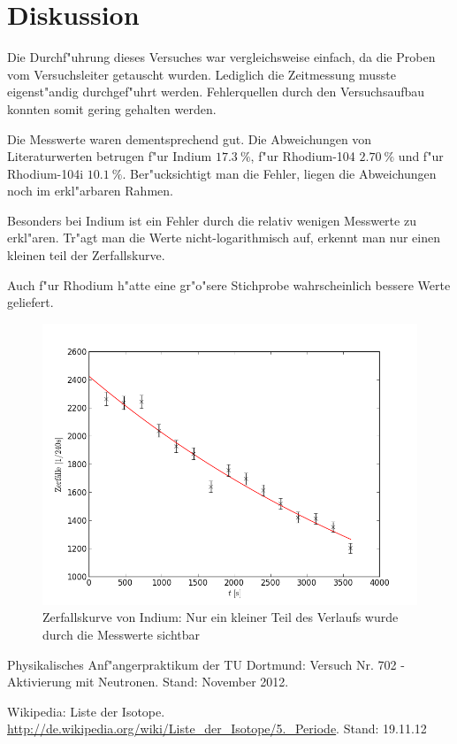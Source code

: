\newpage
\section{Diskussion}
	\label{sec:diskussion}
	Die Durchf"uhrung dieses Versuches war vergleichsweise einfach, da die Proben vom Versuchsleiter getauscht wurden.
	Lediglich die Zeitmessung musste eigenst"andig durch\-ge\-f"uhrt werden.
	Fehlerquellen durch den Versuchsaufbau konnten somit gering gehalten werden.

	Die Messwerte waren dementsprechend gut.
	Die Abweichungen von Literaturwerten \cite{halbwertszeiten} betrugen f"ur Indium $\SI{17.3}{\percent}$, f"ur Rhodium-104 $\SI{2.70}{\percent}$ und f"ur Rhodium-104i $\SI{10.1}{\percent}$.
	Ber"ucksichtigt man die Fehler, liegen die Abweichungen noch im erkl"arbaren Rahmen.

	Besonders bei Indium ist ein Fehler durch die relativ wenigen Messwerte zu erkl"aren.
	Tr"agt man die Werte nicht-logarithmisch auf, erkennt man nur einen kleinen teil der Zerfallskurve.

	Auch f"ur Rhodium h"atte eine gr"o"sere Stichprobe wahrscheinlich bessere Werte geliefert.

	\begin{figure}[!h]
		\centering
		\includegraphics[width = 13cm]{img/graph_indium.png}
		\caption{Zerfallskurve von Indium: Nur ein kleiner Teil des Verlaufs wurde durch die Messwerte sichtbar}
		\label{fig:indium_orig}
	\end{figure}

	\enlargethispage{2cm}

\begin{thebibliography}{9}
	 Physikalisches Anf"angerpraktikum der TU Dortmund: Versuch Nr. 702 - Aktivierung mit Neutronen. Stand: November 2012.

	 Wikipedia: Liste der Isotope. \url{http://de.wikipedia.org/wiki/Liste_der_Isotope/5._Periode}. Stand: 19.11.12
\end{thebibliography}
